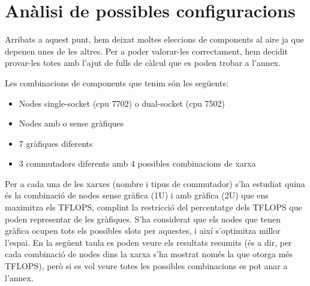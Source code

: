 \section{Anàlisi de possibles configuracions}

Arribats a aquest punt, hem deixat moltes eleccions de components al aire ja que depenen unes de les altres. Per a poder valorar-les correctament, hem decidit provar-les totes amb l'ajut de fulls de càlcul que es poden trobar a l'annex.

Les combinacions de components que tenim són les següents:
\begin{itemize}
    \item {Nodes single-socket (cpu 7702) o dual-socket (cpu 7502)}
    \item {Nodes amb o sense gràfiques}
    \item {7 gràfiques diferents}
    \item {3 commutadors diferents amb 4 possibles combinacions de xarxa}
\end{itemize}



Per a cada una de les xarxes (nombre i tipus de commutador) s'ha estudiat quina és la combinació de nodes sense gràfica (1U) i amb gràfica (2U) que ens maximitza els TFLOPS, complint la restricció del percentatge dels TFLOPS que poden representar de les gràfiques. S'ha considerat que els nodes que tenen gràfica ocupen tots els possibles slots per aquestes, i així s'optimitza millor l'espai. En la següent taula es poden veure els resultats resumits (és a dir, per cada combinació de nodes dins la xarxa s'ha mostrat només la que otorga més TFLOPS), però si es vol veure totes les possibles combinacions es pot anar a l'annex.

